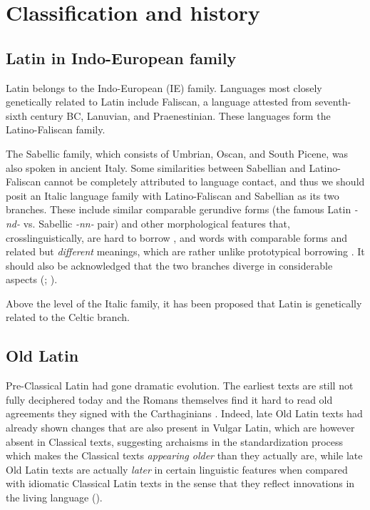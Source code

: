 \documentclass[a4paper, oneside, 12pt]{report}
\newcommand*{\citepage}[1]{p.~{#1}}
\newcommand*{\citepages}[1]{pp.~{#1}}
\newcommand{\form}[1]{\emph{#1}}
\begin{document}
\section{Classification and history}\label{sec:introduction.history}

\subsection{Latin in Indo-European family}

Latin belongs to the Indo-European (IE) family.
Languages most closely genetically related to Latin include Faliscan,
a language attested from seventh-sixth century BC,
Lanuvian, and Praenestinian.
These languages form the Latino-Faliscan family.

The Sabellic family, which consists of Umbrian, Oscan, and South Picene,
was also spoken in ancient Italy.
Some similarities between Sabellian and Latino-Faliscan cannot be completely attributed to language contact,
and thus we should posit an Italic language family
with Latino-Faliscan and Sabellian as its two branches.
These include similar comparable gerundive forms (the famous Latin \form{-nd-} vs. Sabellic \form{-nn-} pair)
and other morphological features that, crosslinguistically, are hard to borrow \citep[\citepages{66-68}]{clackson2011blackwell},
and words with comparable forms and related but \emph{different} meanings,
which are rather unlike prototypical borrowing \citep[\citepages{121}]{weiss2022italic}.
It should also be acknowledged that the two branches diverge in considerable aspects 
(\citealt[\citepages{122}]{weiss2022italic}; \citealt[\citepages{69-72}]{clackson2011blackwell}).

Above the level of the Italic family,
it has been proposed that Latin is genetically related to the Celtic branch. 

\subsection{Old Latin}

Pre-Classical Latin had gone dramatic evolution.
The earliest texts are still not fully deciphered today
and the Romans themselves find it hard to read old agreements they signed with the Carthaginians
\citep[\citepage{52}]{leonhardt2013latin}.
Indeed, late Old Latin texts had already shown changes that are also present in Vulgar Latin,
which are however absent in Classical texts,
suggesting archaisms in the standardization process
which makes the Classical texts \emph{appearing older} than they actually are,
while late Old Latin texts are actually \emph{later} in certain linguistic features when compared with idiomatic Classical Latin texts in the sense that they reflect 
innovations in the living language
().
\end{document}
